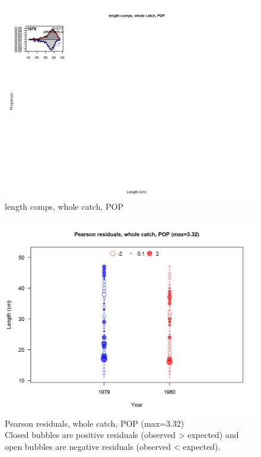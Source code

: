 \documentclass[12pt,]{article}
\begin{document}
\begin{figure}
\centering
\includegraphics{./r4ss/plots_mod1/comp_lenfit_flt2mkt0.png}
\caption{length comps, whole catch, POP
\label{fig:mod1_9_comp_lenfit_flt2mkt0}}
\end{figure}

\begin{figure}
\centering
\includegraphics{./r4ss/plots_mod1/comp_lenfit_residsflt2mkt0.png}
\caption{Pearson residuals, whole catch, POP (max=3.32)\\
Closed bubbles are positive residuals (observed \textgreater{} expected)
and open bubbles are negative residuals (observed \textless{} expected).
\label{fig:mod1_10_comp_lenfit_residsflt2mkt0}}
\end{figure}
\end{document}
